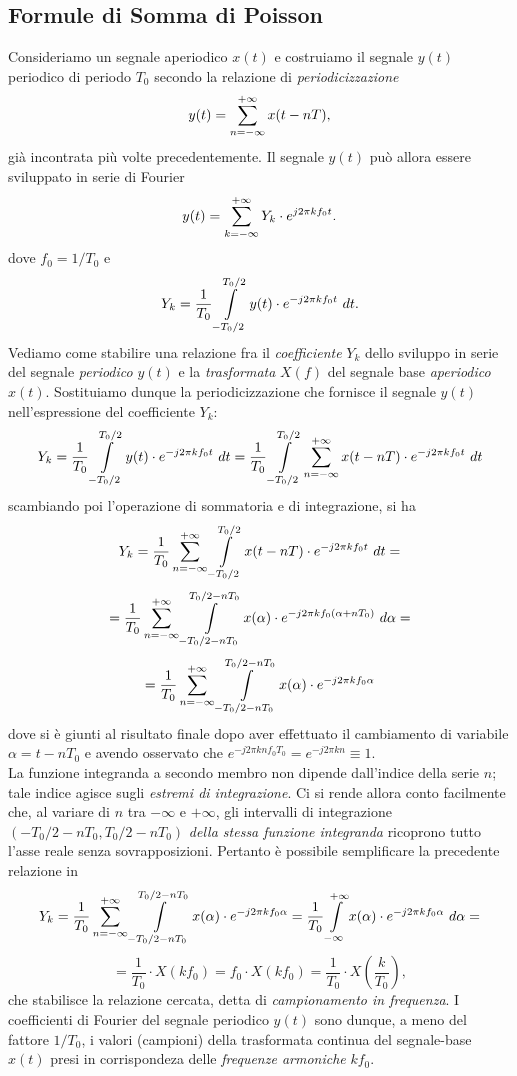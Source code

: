 \documentclass[12pt,oneside,openany]{memoir}
\numberwithin{equation}{subsection}
\newcommand{\dt}{\ dt}
\begin{document}
\newpage
\subsection{Formule di Somma di Poisson}
Consideriamo un segnale aperiodico $x(t)$ e costruiamo il segnale $y(t)$
periodico di periodo $T_0$ secondo la relazione di \textit{periodicizzazione}
\[
    y(t) = \sum\displaylimits_{n = -\infty}^{+\infty} x(t - nT),
\]
gi\`a incontrata pi\`u volte precedentemente. Il segnale $y(t)$ pu\`o allora
essere sviluppato in serie di Fourier
\[
    y(t) = \sum\displaylimits_{k = -\infty}^{+\infty} Y_k \cdot e^{j 2 \pi k
    f_0 t}.
\]
dove $f_0 = 1/T_0$ e
\[
    Y_k = \frac{1}{T_0} \int\displaylimits_{-T_0/2}^{T_0/2} y(t) \cdot e^{-j 2
    \pi k f_0 t} \dt.
\]
Vediamo come stabilire una relazione fra il \textit{coefficiente} $Y_k$ dello
sviluppo in serie del segnale \textit{periodico} $y(t)$ e la
\textit{trasformata} $X(f)$ del segnale base \textit{aperiodico} $x(t)$.
Sostituiamo dunque la periodicizzazione che fornisce il segnale  $y(t)$
nell'espressione del coefficiente $Y_k$:
\[
    Y_k = \frac{1}{T_0} \int\displaylimits_{-T_0/2}^{T_0/2} y(t) \cdot e^{-j 2
    \pi k f_0 t} \dt = \frac{1}{T_0} \int\displaylimits_{-T_0/2}^{T_0/2}
    \sum\displaylimits_{n = -\infty}^{+\infty} x(t - nT) \cdot
    e^{-j 2 \pi k f_0 t} \dt
\]
scambiando poi l'operazione di sommatoria e di integrazione, si ha
\[
    Y_k = \frac{1}{T_0} \sum\displaylimits_{n = -\infty}^{+\infty}
    \int\displaylimits_{-T_0/2}^{T_0/2} x(t - nT) \cdot
    e^{-j 2 \pi k f_0 t} \dt =
\]
\[
    = \frac{1}{T_0} \sum\displaylimits_{n = -\infty}^{+\infty}
    \int\displaylimits_{-T_0/2 - n T_0}^{T_0/2 - nT_0} x(\alpha) \cdot
    e^{-j 2 \pi k f_0 (\alpha + nT_0)} \ d \alpha =
\]
\[
    = \frac{1}{T_0} \sum\displaylimits_{n = -\infty}^{+\infty}
    \int\displaylimits_{-T_0/2 - nT_0}^{T_0/2 - nT_0} x(\alpha) \cdot
    e^{-j 2 \pi k f_0 \alpha}
\]
dove si \`e giunti al risultato finale dopo aver effettuato il cambiamento di
variabile $\alpha = t - nT_0$ e avendo osservato che $e^{-j 2 \pi k n f_0 T_0} =
e^{-j 2 \pi k n} \equiv 1$.\\
La funzione integranda a secondo membro non dipende dall'indice della serie $n$;
tale indice agisce sugli \textit{estremi di integrazione}. Ci si rende allora
conto facilmente che, al variare di $n$ tra $-\infty$ e $+\infty$, gli
intervalli di integrazione $(-T_0/2 - nT_0, T_0/2 - nT_0)$ \textit{della stessa
funzione integranda} ricoprono tutto l'asse reale senza sovrapposizioni.
Pertanto \`e possibile semplificare la precedente relazione in
\[
    Y_k = \frac{1}{T_0} \sum\displaylimits_{n = -\infty}^{+\infty}
    \int\displaylimits_{-T_0/2 - nT_0}^{T_0/2 - nT_0} x(\alpha) \cdot
    e^{-j 2 \pi k f_0 \alpha} =
    \frac{1}{T_0} \int\displaylimits_{-\infty}^{+\infty} x(\alpha) \cdot
    e^{-j 2 \pi k f_0 \alpha} \ d \alpha = 
\]
\[
    = \frac{1}{T_0} \cdot X(k f_0) = f_0 \cdot X(k f_0) = \frac{1}{T_0} \cdot
    X\left(\frac{k}{T_0}\right),
\]
che stabilisce la relazione cercata, detta di \textit{campionamento in
frequenza}. I coefficienti di Fourier del segnale periodico $y(t)$ sono dunque,
a meno del fattore $1/T_0$, i valori (campioni) della trasformata continua del
segnale-base $x(t)$ presi in corrispondeza delle \textit{frequenze armoniche}
$k f_0$.
\end{document}
